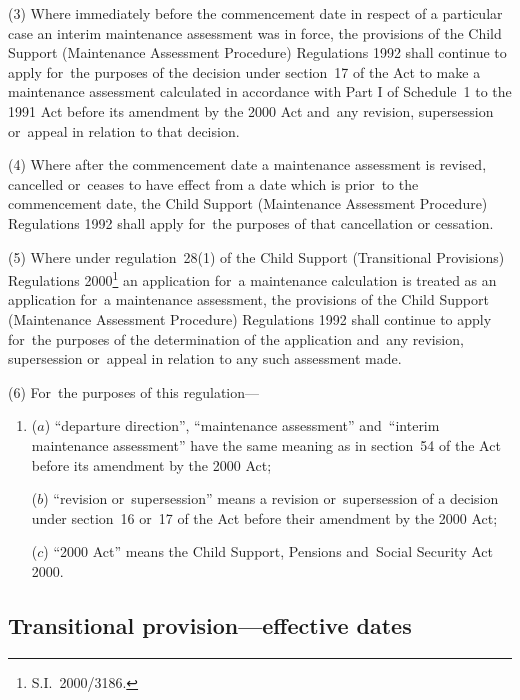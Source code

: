 \documentclass[12pt,a4paper]{article}
\begin{document}
(3) Where immediately before the commencement date in respect of a particular case an interim maintenance assessment was in force, the provisions of the Child Support (Maintenance Assessment Procedure) Regulations 1992 shall continue to apply for~the purposes of the decision under section~17 of the Act to make a maintenance assessment calculated in accordance with Part I of Schedule~1 to the 1991 Act before its amendment by the 2000 Act and~any revision, supersession or~appeal in relation to that decision.

(4) Where after the commencement date a maintenance assessment is revised, cancelled or~ceases to have effect from a date which is prior~to the commencement date, the Child Support (Maintenance Assessment Procedure) Regulations 1992 shall apply for~the purposes of that cancellation or cessation.

(5) Where under regulation~28(1) of the Child Support (Transitional Provisions) Regulations 2000\footnote{S.I.~2000/3186.} an application for~a maintenance calculation is treated as an application for~a maintenance assessment, the provisions of the Child Support (Maintenance Assessment Procedure) Regulations 1992 shall continue to apply for~the purposes of the determination of the application and~any revision, supersession or~appeal in relation to any such assessment made.

(6) For~the purposes of this regulation—
\begin{enumerate}\item[]
($a$) “departure direction”, “maintenance assessment” and~“interim maintenance assessment” have the same meaning as in section~54 of the Act before its amendment by the 2000 Act;

($b$) “revision or~supersession” means a revision or~supersession of a decision under section~16 or~17 of the Act before their amendment by the 2000 Act;

($c$) “2000 Act” means the Child Support, Pensions and~Social Security Act 2000.
\end{enumerate}


\subsection[31. Transitional provision—effective dates
]{Transitional provision—effective dates 
}
\end{document}
